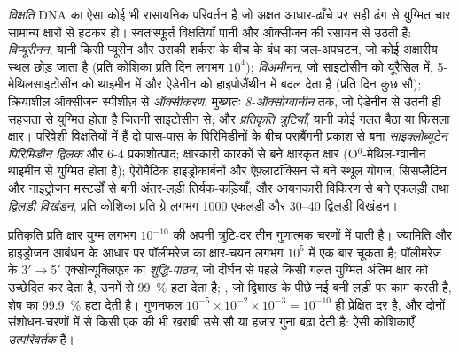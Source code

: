 \begin{definition}[DNA विक्षतियाँ]\label{def:b3:dna-repair:lesions}
\emph{विक्षति} DNA का ऐसा कोई भी रासायनिक परिवर्तन है जो अक्षत आधार-ढाँचे
पर सही ढंग से युग्मित चार सामान्य क्षारों से हटकर हो। स्वतःस्फूर्त
विक्षतियाँ पानी और ऑक्सीजन की रसायन से उठती हैं: \emph{विप्यूरीनन},
यानी किसी प्यूरीन और उसकी शर्करा के बीच के बंध का जल-अपघटन, जो कोई
अक्षारीय स्थल छोड़ जाता है (प्रति कोशिका प्रति दिन लगभग $10^{4}$);
\emph{विअमीनन}, जो साइटोसीन को यूरैसिल में, 5-मेथिलसाइटोसीन को थाइमीन
में और ऐडेनीन को हाइपोज़ैंथीन में बदल देता है (प्रति दिन कुछ सौ);
क्रियाशील ऑक्सीजन स्पीशीज़ से \emph{ऑक्सीकरण}, मुख्यतः
\emph{8-ऑक्सोग्वानीन} तक, जो ऐडेनीन से उतनी ही सहजता से युग्मित होता है
जितनी साइटोसीन से; और \emph{प्रतिकृति त्रुटियाँ}, यानी कोई गलत बैठा या
फिसला क्षार। परिवेशी विक्षतियों में हैं दो पास-पास के पिरिमिडीनों के
बीच पराबैंगनी प्रकाश से बना \emph{साइक्लोब्यूटेन पिरिमिडीन द्विलक} और
6-4 प्रकाशोत्पाद; क्षारकारी कारकों से बने क्षारकृत क्षार
(O$^{6}$-मेथिल-\linebreak[0]ग्वानीन थाइमीन से युग्मित होता है); ऐरोमैटिक
हाइड्रोकार्बनों और ऐफ़्लाटॉक्सिन से बने स्थूल योगज; सिसप्लैटिन और
नाइट्रोजन मस्टर्डों से बनी अंतर-लड़ी तिर्यक-कड़ियाँ; और आयनकारी विकिरण
से बने एकलड़ी तथा \emph{द्विलड़ी विखंडन}, प्रति कोशिका प्रति ग्रे लगभग
\num{1000} एकलड़ी और \numrange{30}{40} द्विलड़ी विखंडन।
\end{definition}

\begin{proposition}[निष्ठा की सीढ़ी]\label{prop:b3:dna-repair:fidelity}
प्रतिकृति प्रति क्षार युग्म लगभग $10^{-10}$ की अपनी त्रुटि-दर तीन
गुणात्मक चरणों में पाती है। ज्यामिति और हाइड्रोजन आबंधन के आधार पर
पॉलीमरेज़ का क्षार-चयन लगभग $10^{5}$ में एक बार चूकता है; पॉलीमरेज़ के
3$'\to$5$'$ एक्सोन्यूक्लिएज़ का \emph{शुद्धि-पाठन}, जो दीर्घन से पहले
किसी गलत युग्मित अंतिम क्षार को उच्छेदित कर देता है, उनमें से
\qty{99}{\%} हटा देता है; \emph{}, जो द्विशाख के पीछे नई
बनी लड़ी पर काम करती है, शेष का \qty{99.9}{\%} हटा देती है। गुणनफल
$10^{-5}\times 10^{-2}\times 10^{-3} = 10^{-10}$ ही प्रेक्षित दर है,
और दोनों संशोधन-चरणों में से किसी एक की भी खराबी उसे सौ या हज़ार गुना
बढ़ा देती है: ऐसी कोशिकाएँ \emph{उत्परिवर्तक} हैं।
\end{proposition}

